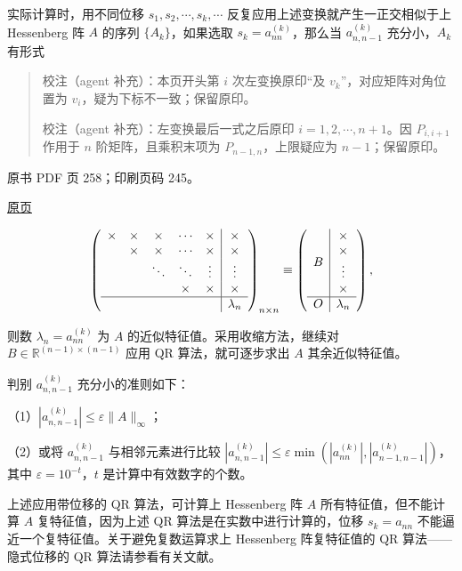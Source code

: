 实际计算时，用不同位移 \(s_1,s_2,\cdots,s_k,\cdots\) 反复应用上述变换就产生一正交相似于上 Hessenberg 阵 \(A\) 的序列 \(\{A_k\}\)，如果选取 \(s_k=a_{nn}^{(k)}\)，那么当 \(a_{n,n-1}^{(k)}\) 充分小，\(A_k\) 有形式

\begin{quote}
校注（agent 补充）：本页开头第 \(i\) 次左变换原印``及 \(v_k\)''，对应矩阵对角位置为 \(v_i\)，疑为下标不一致；保留原印。

校注（agent 补充）：左变换最后一式之后原印 \(i=1,2,\cdots,n+1\)。因 \(P_{i,i+1}\) 作用于 \(n\) 阶矩阵，且乘积末项为 \(P_{n-1,n}\)，上限疑应为 \(n-1\)；保留原印。
\end{quote}

\clearpage

原书 PDF 页 258；印刷页码 245。

\href{source-images/pdf-258.jpeg}{原页}

\[
\left(\begin{array}{ccccc|c}
\times&\times&\times&\cdots&\times&\times\\
&\times&\times&\cdots&\times&\times\\
&&\ddots&\ddots&\vdots&\vdots\\
&&&\times&\times&\times\\\hline
&&&&&\lambda_n
\end{array}\right)_{n\times n}
\equiv\left(\begin{array}{c|c}
B&\begin{matrix}\times\\\times\\\vdots\\\times\end{matrix}\\\hline
O&\lambda_n
\end{array}\right),
\]

则数 \(\lambda_n=a_{nn}^{(k)}\) 为 \(A\) 的近似特征值。采用收缩方法，继续对 \(B\in\mathbb R^{(n-1)\times(n-1)}\) 应用 QR 算法，就可逐步求出 \(A\) 其余近似特征值。

判别 \(a_{n,n-1}^{(k)}\) 充分小的准则如下：

（1）\(|a_{n,n-1}^{(k)}|\leq\varepsilon\|A\|_\infty\)；

（2）或将 \(a_{n,n-1}^{(k)}\) 与相邻元素进行比较 \(|a_{n,n-1}^{(k)}|\leq\varepsilon\min(|a_{nn}^{(k)}|,|a_{n-1,n-1}^{(k)}|)\)，其中 \(\varepsilon=10^{-t}\)，\(t\) 是计算中有效数字的个数。

上述应用带位移的 QR 算法，可计算上 Hessenberg 阵 \(A\) 所有特征值，但不能计算 \(A\) 复特征值，因为上述 QR 算法是在实数中进行计算的，位移 \(s_k=a_{nn}\) 不能逼近一个复特征值。关于避免复数运算求上 Hessenberg 阵复特征值的 QR 算法------隐式位移的 QR 算法请参看有关文献。

